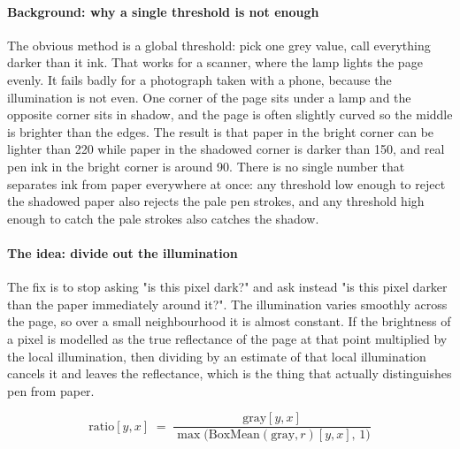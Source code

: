 \paragraph{Background: why a single threshold is not enough}
The obvious method is a global threshold: pick one grey value, call everything darker than it ink. That works for a scanner, where the lamp lights the page evenly. It fails badly for a photograph taken with a phone, because the illumination is not even. One corner of the page sits under a lamp and the opposite corner sits in shadow, and the page is often slightly curved so the middle is brighter than the edges. The result is that paper in the bright corner can be lighter than 220 while paper in the shadowed corner is darker than 150, and real pen ink in the bright corner is around 90. There is no single number that separates ink from paper everywhere at once: any threshold low enough to reject the shadowed paper also rejects the pale pen strokes, and any threshold high enough to catch the pale strokes also catches the shadow.


\paragraph{The idea: divide out the illumination}
The fix is to stop asking "is this pixel dark?" and ask instead "is this pixel darker than the paper immediately around it?". The illumination varies smoothly across the page, so over a small neighbourhood it is almost constant. If the brightness of a pixel is modelled as the true reflectance of the page at that point multiplied by the local illumination, then dividing by an estimate of that local illumination cancels it and leaves the reflectance, which is the thing that actually distinguishes pen from paper.


\begin{equation}
\mathrm{ratio}[y,x] \;=\; \frac{\mathrm{gray}[y,x]}{\max\big(\mathrm{BoxMean}(\mathrm{gray},r)[y,x],\,1\big)}
\end{equation}


